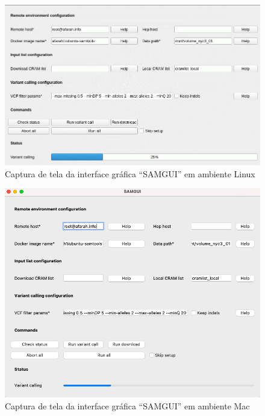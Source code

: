 \documentclass[cic,tc]{iiufrgs}
\begin{document}
\begin{figure}
  \caption{Captura de tela da interface gráfica ``SAMGUI'' em ambiente Linux}
    \begin{center}
      \includegraphics[width=0.85\linewidth]{img/samgui_linux.png}
    \end{center}
    \label{fig:samgui_linux}
\end{figure}

\begin{figure}
  \caption{Captura de tela da interface gráfica ``SAMGUI'' em ambiente Mac}
    \begin{center}
      \includegraphics[width=0.85\linewidth]{img/samgui_mac.png}
    \end{center}
    \label{fig:samgui_mac}
\end{figure}
\end{document}
